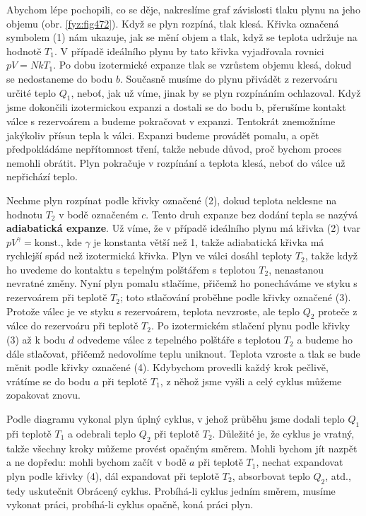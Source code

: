     Abychom lépe pochopili, co se děje, nakreslíme graf závislosti tlaku plynu na jeho objemu (obr.
    \ref{fyz:fig472}). Když se plyn rozpíná, tlak klesá. Křivka označená symbolem (1) nám ukazuje,
    jak se mění objem a tlak, když se teplota udržuje na hodnotě \(T_1\). V případě ideálního plynu
    by tato křivka vyjadřovala rovnici \(pV= NkT_1\). Po dobu izotermické expanze tlak se vzrůstem
    objemu klesá, dokud se nedostaneme do bodu \(b\). Současně musíme do plynu přivádět z rezervoáru
    určité teplo \(Q_1\), neboť, jak už víme, jinak by se plyn rozpínáním ochlazoval. Když jsme
    dokončili izotermickou expanzi a dostali se do bodu b, přerušíme kontakt válce s rezervoárem a
    budeme pokračovat v expanzi. Tentokrát znemožníme jakýkoliv přísun tepla k válci. Expanzi budeme
    provádět pomalu, a opět předpokládáme nepřítomnost tření, takže nebude důvod, proč bychom proces
    nemohli obrátit. Plyn pokračuje v rozpínání a teplota klesá, neboť do válce už nepřichází teplo.

    Nechme plyn rozpínat podle křivky označené (2), dokud teplota neklesne na hodnotu \(T_2\) v bodě
    označeném \(c\). Tento druh expanze bez dodání tepla se nazývá \textbf{adiabatická expanze}. Už
    víme, že v případě ideálního plynu má křivka (2) tvar \(pV^\gamma =\text{konst.}\), kde
    \(\gamma\) je konstanta větší než 1, takže adiabatická křivka má rychlejší spád než izotermická
    křivka. Plyn ve válci dosáhl teploty \(T_2\), takže když ho uvedeme do kontaktu s tepelným
    polštářem s teplotou \(T_2\), nenastanou nevratné změny. Nyní plyn pomalu stlačíme, přičemž ho
    ponecháváme ve styku s rezervoárem při teplotě  \(T_2\); toto stlačování proběhne podle křivky
    označené (3). Protože válec je ve styku s rezervoárem, teplota nevzroste, ale teplo \(Q_2\)
    proteče z válce do rezervoáru při teplotě  \(T_2\). Po izotermickém stlačení plynu podle křivky
    (3) až k bodu \(d\) odvedeme válec z tepelného polštáře s teplotou  \(T_2\) a budeme ho dále
    stlačovat, přičemž nedovolíme teplu uniknout. Teplota vzroste a tlak se bude měnit podle křivky
    označené (4). Kdybychom provedli každý krok pečlivě, vrátíme se do bodu \(a\) při teplotě
    \(T_1\), z něhož jsme vyšli a celý cyklus můžeme zopakovat znovu.

    Podle diagramu vykonal plyn úplný cyklus, v jehož průběhu jsme dodali teplo \(Q_1\) při teplotě
    \(T_1\) a odebrali teplo \(Q_2\) při teplotě \(T_2\). Důležité je, že cyklus je vratný, takže
    všechny kroky můžeme provést opačným směrem. Mohli bychom jít nazpět a ne dopředu: mohli bychom
    začít v bodě \(a\) při teplotě \(T_1\), nechat expandovat plyn podle křivky (4), dál expandovat
    při teplotě \(T_2\), absorbovat teplo \(Q_2\), atd., tedy uskutečnit Obrácený cyklus. Probíhá-li
    cyklus jedním směrem, musíme vykonat práci, probíhá-li cyklus opačně, koná práci plyn.

